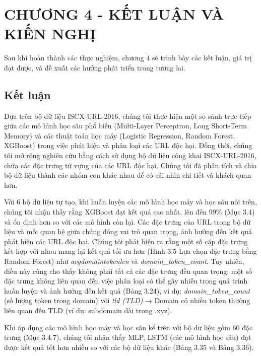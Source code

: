 \documentclass[13pt]{article}
\renewcommand{\thesubsection}{\thesection.\arabic{subsection}} %
\begin{document}
\newpage
\renewcommand{\thesubsection}{\thesection.\arabic{subsection}} %
\setcounter{section}{4} %
\setcounter{subsection}{0}
\section*{CHƯƠNG 4 - KẾT LUẬN VÀ KIẾN NGHỊ}
Sau khi hoàn thành các thực nghiệm, chương 4 sẽ trình bày các kết luận, giá trị đạt được, và đề xuất các hướng phát triển trong tương lai.
\subsection{Kết luận}
Dựa trên bộ dữ liệu ISCX-URL-2016, chúng tôi thực hiện một so sánh trực tiếp giữa các mô hình học sâu phổ biến (Multi-Layer Perceptron, Long Short-Term Memory) và các thuật toán học máy (Logistic Regression, Random Forest, XGBoost) trong việc phát hiện và phân loại các URL độc hại. Đồng thời, chúng tôi mở rộng nghiên cứu bằng cách sử dụng bộ dữ liệu công khai ISCX-URL-2016, chứa các đặc trưng từ vựng của các URL độc hại. Chúng tôi đã phân tích và chia bộ dữ liệu thành các nhóm con khác nhau để có cái nhìn chi tiết và khách quan hơn.

Với 6 bộ dữ liệu tự tạo, khi huấn luyện các mô hình học máy và học sâu nói trên, chúng tôi nhận thấy rằng XGBoost đạt kết quả cao nhất, lên đến 99\% (Mục 3.4) và ổn định hơn so với các mô hình còn lại. Các đặc trưng của URL trong bộ dữ liệu và mối quan hệ giữa chúng đóng vai trò quan trọng, ảnh hưởng đến kết quả phát hiện các URL độc hại. Chúng tôi phát hiện ra rằng một số cặp đặc trưng kết hợp với nhau mang lại kết quả tối ưu hơn (Hình 3.5 Lựa chọn đặc trưng bằng Random Forest) như \textit{avgdomaintokenlen} và \textit{domain\_token\_count}. Tuy nhiên, điều này cũng cho thấy không phải tất cả các đặc trưng đều quan trọng; một số đặc trưng không liên quan đến việc phân loại có thể gây nhiễu trong quá trình huấn luyện và ảnh hưởng đến kết quả (Bảng 3.24), ví dụ: \textit{domain\_token\_count} (số lượng token trong domain) với \textit{tld (TLD)} → Domain có nhiều token thường liên quan đến TLD (ví dụ: subdomain dài trong .xyz).

Khi áp dụng các mô hình học máy và học sâu kể trên với bộ dữ liệu gồm 60 đặc trưng (Mục 3.4.7), chúng tôi nhận thấy MLP, LSTM (các mô hình học sâu) đạt được kết quả tốt hơn nhiều so với các bộ dữ liệu khác (Bảng 3.35 và Bảng 3.36).
\end{document}
